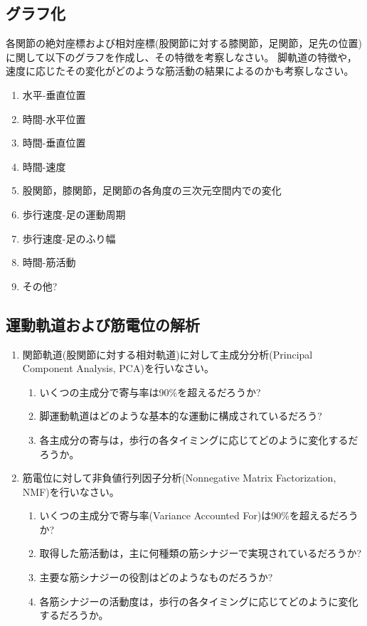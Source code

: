 \documentclass{jarticle}
\begin{document}
\subsection{グラフ化}

各関節の絶対座標および相対座標(股関節に対する膝関節，足関節，足先の位置)に関して以下のグラフを作成し、その特徴を考察しなさい。
脚軌道の特徴や，速度に応じたその変化がどのような筋活動の結果によるのかも考察しなさい。
\begin{enumerate}
\item 水平-垂直位置
\item 時間-水平位置
\item 時間-垂直位置
\item 時間-速度
\item 股関節，膝関節，足関節の各角度の三次元空間内での変化
\item 歩行速度-足の運動周期
\item 歩行速度-足のふり幅
\item 時間-筋活動
\item その他?
\end{enumerate}

\subsection{運動軌道および筋電位の解析}

\begin{enumerate}
  \item 関節軌道(股関節に対する相対軌道)に対して主成分分析(Principal Component Analysis, PCA)を行いなさい。
  \begin{enumerate}
    \item いくつの主成分で寄与率は90\%を超えるだろうか? 
    \item 脚運動軌道はどのような基本的な運動に構成されているだろう?
    \item 各主成分の寄与は，歩行の各タイミングに応じてどのように変化するだろうか。
  \end{enumerate}
  
  \item 筋電位に対して非負値行列因子分析(Nonnegative Matrix Factorization, NMF)を行いなさい。
  \begin{enumerate}
    \item いくつの主成分で寄与率(Variance Accounted For)は90\%を超えるだろうか? 
    \item 取得した筋活動は，主に何種類の筋シナジーで実現されているだろうか?
    \item 主要な筋シナジーの役割はどのようなものだろうか?
    \item 各筋シナジーの活動度は，歩行の各タイミングに応じてどのように変化するだろうか。
  \end{enumerate}
\end{enumerate}
\end{document}
